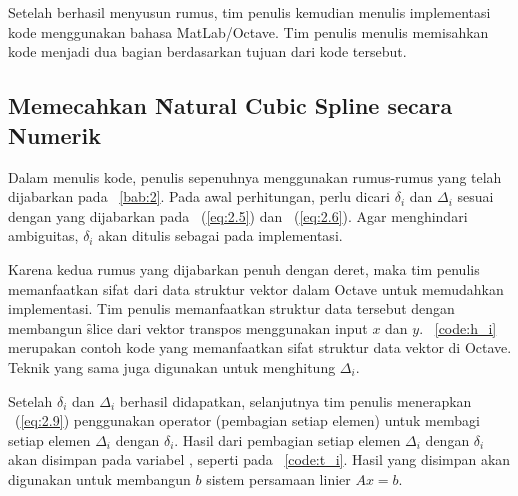 \chapter{\babTiga}
\label{bab:3}
Setelah berhasil menyusun rumus, tim penulis kemudian menulis implementasi kode menggunakan
bahasa MatLab/Octave. Tim penulis menulis memisahkan kode menjadi dua bagian berdasarkan
tujuan dari kode tersebut.


\section{Memecahkan \f{Natural Cubic Spline} secara Numerik}
\label{sec:numericCubicSpline}
Dalam menulis kode, penulis sepenuhnya menggunakan rumus-rumus yang telah dijabarkan pada
\bab~\ref{bab:2}. Pada awal perhitungan, perlu dicari $\delta_i$ dan $\Delta_i$
sesuai dengan yang dijabarkan pada \equ~(\ref{eq:2.5}) dan \equ~(\ref{eq:2.6}). Agar menghindari
ambiguitas, $\delta_i$ akan ditulis sebagai  pada implementasi.

Karena kedua rumus yang dijabarkan penuh dengan deret, maka tim penulis
memanfaatkan sifat dari data struktur vektor dalam Octave untuk memudahkan
implementasi. Tim penulis memanfaatkan struktur data tersebut dengan membangun
\f{slice} dari vektor transpos menggunakan input $x$ dan $y$. \lst~\ref{code:h_i}
merupakan contoh kode yang memanfaatkan sifat struktur data vektor di Octave.
Teknik yang sama juga digunakan untuk menghitung $\Delta_i$.



Setelah $\delta_i$ dan $\Delta_i$ berhasil didapatkan, selanjutnya tim penulis
menerapkan \equ~(\ref{eq:2.9}) penggunakan operator  (pembagian setiap elemen)
untuk membagi setiap elemen $\Delta_i$ dengan $\delta_i$. Hasil dari pembagian
setiap elemen $\Delta_i$ dengan $\delta_i$ akan disimpan pada variabel ,
seperti pada \lst~\ref{code:t_i}. Hasil yang disimpan akan digunakan untuk
membangun $b$ sistem persamaan linier $A x = b$.



